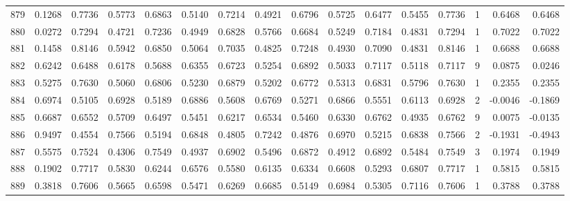 \begin{tabular}{lrrrrrrrrrrrrrrr}
879 &      0.1268 &  0.7736 &  0.5773 &  0.6863 &  0.5140 &  0.7214 &  0.4921 &  0.6796 &  0.5725 &  0.6477 &   0.5455 &     0.7736 &      1 &                    0.6468 &                     0.6468 \\
880 &      0.0272 &  0.7294 &  0.4721 &  0.7236 &  0.4949 &  0.6828 &  0.5766 &  0.6684 &  0.5249 &  0.7184 &   0.4831 &     0.7294 &      1 &                    0.7022 &                     0.7022 \\
881 &      0.1458 &  0.8146 &  0.5942 &  0.6850 &  0.5064 &  0.7035 &  0.4825 &  0.7248 &  0.4930 &  0.7090 &   0.4831 &     0.8146 &      1 &                    0.6688 &                     0.6688 \\
882 &      0.6242 &  0.6488 &  0.6178 &  0.5688 &  0.6355 &  0.6723 &  0.5254 &  0.6892 &  0.5033 &  0.7117 &   0.5118 &     0.7117 &      9 &                    0.0875 &                     0.0246 \\
883 &      0.5275 &  0.7630 &  0.5060 &  0.6806 &  0.5230 &  0.6879 &  0.5202 &  0.6772 &  0.5313 &  0.6831 &   0.5796 &     0.7630 &      1 &                    0.2355 &                     0.2355 \\
884 &      0.6974 &  0.5105 &  0.6928 &  0.5189 &  0.6886 &  0.5608 &  0.6769 &  0.5271 &  0.6866 &  0.5551 &   0.6113 &     0.6928 &      2 &                   -0.0046 &                    -0.1869 \\
885 &      0.6687 &  0.6552 &  0.5709 &  0.6497 &  0.5451 &  0.6217 &  0.6534 &  0.5460 &  0.6330 &  0.6762 &   0.4935 &     0.6762 &      9 &                    0.0075 &                    -0.0135 \\
886 &      0.9497 &  0.4554 &  0.7566 &  0.5194 &  0.6848 &  0.4805 &  0.7242 &  0.4876 &  0.6970 &  0.5215 &   0.6838 &     0.7566 &      2 &                   -0.1931 &                    -0.4943 \\
887 &      0.5575 &  0.7524 &  0.4306 &  0.7549 &  0.4937 &  0.6902 &  0.5496 &  0.6872 &  0.4912 &  0.6892 &   0.5484 &     0.7549 &      3 &                    0.1974 &                     0.1949 \\
888 &      0.1902 &  0.7717 &  0.5830 &  0.6244 &  0.6576 &  0.5580 &  0.6135 &  0.6334 &  0.6608 &  0.5293 &   0.6807 &     0.7717 &      1 &                    0.5815 &                     0.5815 \\
889 &      0.3818 &  0.7606 &  0.5665 &  0.6598 &  0.5471 &  0.6269 &  0.6685 &  0.5149 &  0.6984 &  0.5305 &   0.7116 &     0.7606 &      1 &                    0.3788 &                     0.3788 \\

\end{tabular}
